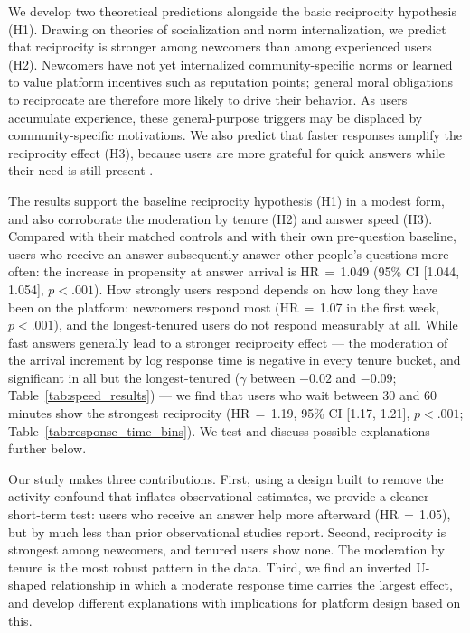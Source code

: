 We develop two theoretical predictions alongside the basic reciprocity hypothesis (H1). Drawing on theories of socialization and norm internalization, we predict that reciprocity is stronger among newcomers than among experienced users (H2). Newcomers have not yet internalized community-specific norms or learned to value platform incentives such as reputation points; general moral obligations to reciprocate are therefore more likely to drive their behavior. As users accumulate experience, these general-purpose triggers may be displaced by community-specific motivations. We also predict that faster responses amplify the reciprocity effect (H3), because users are more grateful for quick answers while their need is still present \citep{mccullough_is_2001, tsang_gratitude_2006}.

The results support the baseline reciprocity hypothesis (H1) in a modest form, and also corroborate the moderation by tenure (H2) and answer speed (H3). Compared with their matched controls and with their own pre-question baseline, users who receive an answer subsequently answer other people's questions more often: the increase in propensity at answer arrival is HR\,$=$\,1.049 (95\% CI [1.044, 1.054], $p<.001$). How strongly users respond depends on how long they have been on the platform: newcomers respond most (HR\,$=$\,1.07 in the first week, $p < .001$), and the longest-tenured users do not respond measurably at all.
While fast answers generally lead to a stronger reciprocity effect --- the moderation of the arrival increment by log response time is negative in every tenure bucket, and significant in all but the longest-tenured ($\gamma$ between $-0.02$ and $-0.09$; Table~\ref{tab:speed_results}) --- we find that users who wait between 30 and 60 minutes show the strongest reciprocity (HR\,$=$\,1.19, 95\% CI [1.17, 1.21], $p<.001$; Table~\ref{tab:response_time_bins}). We test and discuss possible explanations further below.

Our study makes three contributions. First, using a design built to remove the activity confound that inflates observational estimates, we provide a cleaner short-term test: users who receive an answer help more afterward (HR\,$=$\,1.05), but by much less than prior observational studies report. Second, reciprocity is strongest among newcomers, and tenured users show none. The moderation by tenure is the most robust pattern in the data. Third, we find an inverted U-shaped relationship in which a moderate response time carries the largest effect, and develop different explanations with implications for platform design based on this. 

